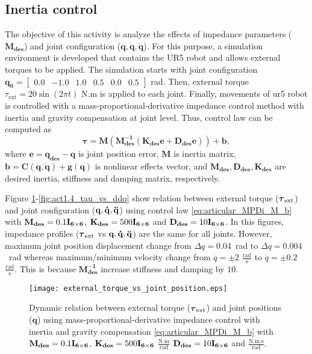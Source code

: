\graphicspath{{images/act_1.4/}}
\subsection{Inertia control}
The objective of this activity is analyze the effects of impedance parameters ($\mathbf{M_{des}}$) and joint configuration ($\mathbf{q, \dot{q}, \ddot{q}}$). For this purpose, a simulation environment is developed that contains the UR5 robot and allows external torques to be applied. The simulation starts with joint configuration $\mathbf{q_0}=\begin{bmatrix} 0.0 & -1.0 & 1.0 & 0.5 & 0.0 & 0.5 \end{bmatrix}$ rad. Then, external torque $\tau_\mathrm{ext}= 20\sin{(2\pi t)}$ N.m is applied to each joint. Finally, movements of ur5 robot is controlled with a mass-proportional-derivative impedance control method with inertia and gravity compensation at joint level. Thus, control law can be computed as 
\begin{equation}
	\boldsymbol{\tau}
	= \mathbf{M}\left( \mathbf{M_{des}^{-1}} \left(\mathbf{K_{des} e} + \mathbf{D_{des} \dot{e}} \right)\right) + \mathbf{b},
	\label{eq:articular_MPDi_M_b}
\end{equation}
\noindent where $\mathbf{e}=\mathbf{q_{des} - q}$ is joint position error, $\mathbf{M}$ is inertia matrix, $\mathbf{b}=\mathbf{C(q, \dot{q})} + \mathbf{g(q)}$ is nonlinear effects vector, and $\mathbf{M_{des}, D_{des}, K_{des}}$ are desired inertia, stiffness and damping matrix, respectively.


Figure \ref{fig:act1.4_tau_vs_q}-\ref{fig:act1.4_tau_vs_ddq} show relation between external torque ($\boldsymbol{\tau}_\mathrm{ext}$) and joint configuration ($\mathbf{q, \dot{q}, \ddot{q}}$) using control law \eqref{eq:articular_MPDi_M_b} with $\mathbf{M_{des}}=0.1\mathbf{I_{6 \times 6}}$, $\mathbf{K_{des}}=500\mathbf{I_{6 \times 6}}$ and $\mathbf{D_{des}}=10\mathbf{I_{6 \times 6}}$. In this figures, impedance profiles ($\boldsymbol{\tau}_\mathrm{ext}$ vs $\mathbf{q, \dot{q}, \ddot{q}}$) are the same for all joints. However, maximum joint position displacement change from $\Delta q=0.04$~rad to $\Delta q=0.004$~rad whereas maximum/minimum velocity change from $\dot{q}= \pm 2$ $\mathrm{\frac{rad}{s}}$ to $\dot{q}= \pm 0.2$ $\mathrm{\frac{rad}{s}}$. This is because $\mathbf{M_{des}^{-1}}$ increase stiffness and damping by $10$.

\begin{figure}
\centering
\texttt{[image: external\_torque\_vs\_joint\_position.eps]}
\caption{Dynamic relation between external torque ($\boldsymbol{\tau}_\mathrm{ext}$) and joint positions ($\mathbf{q}$) using mass-proportional-derivative impedance control with inertia and gravity compensation \eqref{eq:articular_MPDi_M_b} with $\mathbf{M_{des}}=0.1\mathbf{I_{6 \times 6}}$, $\mathbf{K_{des}}=500\mathbf{I_{6 \times 6}}$ $\mathrm{\frac{N.m}{rad}}$ $\mathbf{D_{des}}=10\mathbf{I_{6 \times 6}}$ and $\mathrm{\frac{N.m.s}{rad}}$.}
\label{fig:act1.4_tau_vs_q}
\end{figure}

